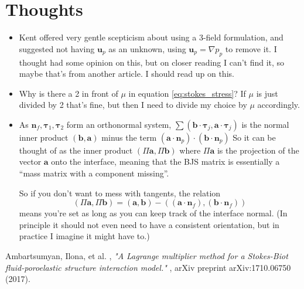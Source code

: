 \documentclass{article}
\newcommand{\mathspace}[1]{\ensuremath{#1}\xspace} %
\newcommand{\grad}{\mathspace{\nabla}}
\newcommand{\inner}[2]{\mathspace{\left (#1, #2 \right)}}
\newcommand{\taubf}{\mathspace{\boldsymbol{\tau}}}
\newcommand{\nf}{\mathspace{\mathbf{n}_f}}
\newcommand{\np}{\mathspace{\mathbf{n}_p}}
\newcommand{\up}{\mathspace{\mathbf{u}_p}}
\newcommand{\pp}{\mathspace{p_p}}
\begin{document}
\section{Thoughts}
\begin{itemize}
\item Kent offered very gentle scepticism about using a 3-field formulation, and suggested not having \up as an unknown, using $\up = \grad \pp$ to remove it. I thought \cite{ambartsumyan} had some opinion on this, but on closer reading I can't find it, so maybe that's from another article. I should read up on this.

\item Why is there a 2 in front of $\mu$ in equation \eqref{eq:stokes_stress}? If $\mu$ is just divided by 2 that's fine, but then I need to divide my choice by $\mu$ accordingly.
\item As $\nf, \taubf_1, \taubf_2$ form an orthonormal system, $\sum \inner{\mathbf{b} \cdot \taubf_j}{\mathbf{a} \cdot \taubf_j}$ is the normal inner product $\inner{\mathbf{b}}{\mathbf{a}}$ minus the term $(\mathbf{a} \cdot \np) \cdot (\mathbf{b} \cdot \np)$ So it can be thought of as the inner product $\inner{\Pi{\mathbf{a}}}{\Pi{\mathbf{b}}}$ where $\Pi\mathbf{a}$ is the projection of the vector $\mathbf{a}$ onto the interface, meaning that the BJS matrix is essentially a ``mass matrix with a component missing''.

  So if you don't want to mess with tangents, the relation $$\inner{\Pi\mathbf{a}}{\Pi\mathbf{b}} = \inner{\mathbf{a}}{\mathbf{b}} - \inner{(\mathbf{a} \cdot \nf)}{(\mathbf{b} \cdot \nf)}$$ means you're set as long as you can keep track of the interface normal. (In principle it should not even need to have a consistent orientation, but in practice I imagine it might have to.) 
 
\end{itemize}



\begin{thebibliography}{99}
{\sc Ambartsumyan, Ilona, et al. }, {\em "A Lagrange multiplier method for a Stokes-Biot fluid-poroelastic structure interaction model." }, arXiv preprint arXiv:1710.06750 (2017).
  
\end{thebibliography}
\end{document}
